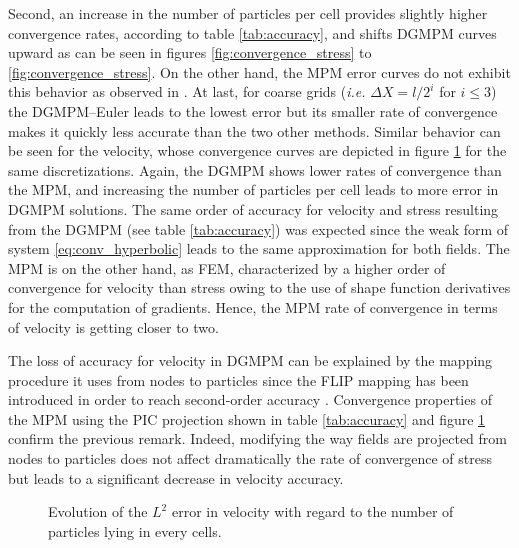 Second, an increase in the number of particles per cell provides slightly higher convergence rates, according to table \ref{tab:accuracy}, and shifts DGMPM curves upward as can be seen in figures \ref{fig:convergence_stress} to \ref{fig:convergence_stress}.
On the other hand, the MPM error curves do not exhibit this behavior as observed in \cite{MPM_BSpline1}.
At last, for coarse grids (\textit{i.e.} $\Delta X= l/2^i$ for $i \leq 3$) the DGMPM--Euler leads to the lowest error but its smaller rate of convergence makes it quickly less accurate than the two other methods.
Similar behavior can be seen for the velocity, whose convergence curves are depicted in figure \ref{fig:convergence_velocity} for the same discretizations.
Again, the DGMPM shows lower rates of convergence than the MPM, and increasing the number of particles per cell leads to more error in DGMPM solutions.
The same order of accuracy for velocity and stress resulting from the DGMPM (see table \ref{tab:accuracy}) was expected since the weak form of system \eqref{eq:conv_hyperbolic} leads to the same approximation for both fields.
The MPM is on the other hand, as FEM, characterized by a higher order of convergence for velocity than stress owing to the use of shape function derivatives for the computation of gradients.
Hence, the MPM rate of convergence in terms of velocity is getting closer to two. 

The loss of accuracy for velocity in DGMPM can be explained by the mapping procedure it uses from nodes to particles since the FLIP mapping has been introduced in order to reach second-order accuracy \cite{PIC_Nishiguchi}.
Convergence properties of the MPM using the PIC projection shown in table \ref{tab:accuracy} and figure \ref{fig:convergence_velocity} confirm the previous remark.
Indeed, modifying the way fields are projected from nodes to particles does not affect dramatically the rate of convergence of stress but leads to a significant decrease in velocity accuracy.
\begin{figure}[h!]
  \centering
  {\label{subfig:convV_2ppc}}
  {\label{subfig:convV_6ppc}}
  {\label{subfig:convV_10ppc}}
  {\label{subfig:convV_20ppc}}
  \caption{Evolution of the $L^2$ error in velocity with regard to the number of particles lying in every cells.}
  \label{fig:convergence_velocity}
\end{figure}

